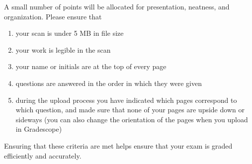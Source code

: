 \documentclass[12pt]{exam}
\begin{document}
\begin{questions}
{        
        
        }
    \fi
    

    

    
    
    \newpage\Initials
    \question[2] A small number of points will be allocated for presentation, neatness, and organization. Please ensure that
    \begin{enumerate}
        \item your scan is under 5 MB in file size
        \item your work is legible in the scan
        \item your name or initials are at the top of every page
        \item questions are answered in the order in which they were given
        \item during the upload process you have indicated which pages correspond to which question, and made sure that none of your pages are upside down or sideways (you can also change the orientation of the pages when you upload in Gradescope)
    \end{enumerate}
    Ensuring that these criteria are met helps ensure that your exam is graded efficiently and accurately. 
    

\end{questions}
\end{document}
